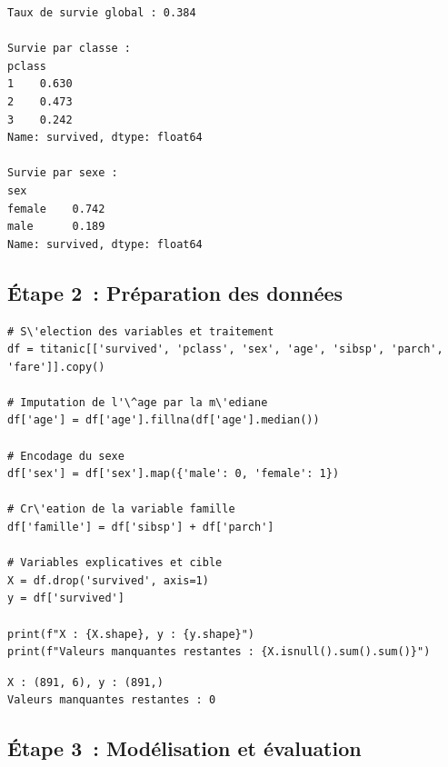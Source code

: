\begin{codeoutput}
\begin{verbatim}
Taux de survie global : 0.384

Survie par classe :
pclass
1    0.630
2    0.473
3    0.242
Name: survived, dtype: float64

Survie par sexe :
sex
female    0.742
male      0.189
Name: survived, dtype: float64
\end{verbatim}
\end{codeoutput}

\subsection{\'Etape 2~: Pr\'eparation des donn\'ees}

\begin{codeblock}[title=\textbf{Python}]
\begin{verbatim}
# S\'election des variables et traitement
df = titanic[['survived', 'pclass', 'sex', 'age', 'sibsp', 'parch', 'fare']].copy()

# Imputation de l'\^age par la m\'ediane
df['age'] = df['age'].fillna(df['age'].median())

# Encodage du sexe
df['sex'] = df['sex'].map({'male': 0, 'female': 1})

# Cr\'eation de la variable famille
df['famille'] = df['sibsp'] + df['parch']

# Variables explicatives et cible
X = df.drop('survived', axis=1)
y = df['survived']

print(f"X : {X.shape}, y : {y.shape}")
print(f"Valeurs manquantes restantes : {X.isnull().sum().sum()}")
\end{verbatim}
\end{codeblock}

\begin{codeoutput}
\begin{verbatim}
X : (891, 6), y : (891,)
Valeurs manquantes restantes : 0
\end{verbatim}
\end{codeoutput}

\subsection{\'Etape 3~: Mod\'elisation et \'evaluation}

